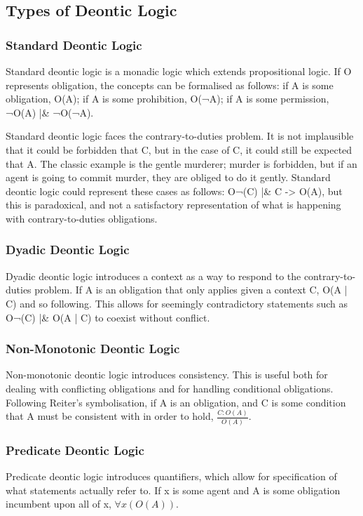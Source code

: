 \documentclass{l4proj}
\begin{document}
\subsection{Types of Deontic Logic}

\subsubsection{Standard Deontic Logic}
Standard deontic logic is a monadic logic which extends propositional logic. If O represents obligation, the concepts can be formalised as follows: if A is some obligation, O(A); if A is some prohibition, O(¬A); if A is some permission, ¬O(A) |\& ¬O(¬A). 

Standard deontic logic faces the contrary-to-duties problem. It is not implausible that it could be forbidden that C, but in the case of C, it could still be expected that A. The classic example is the gentle murderer; murder is forbidden, but if an agent is going to commit murder, they are obliged to do it gently. Standard deontic logic could represent these cases as follows: O¬(C) |\& C -> O(A), but this is paradoxical, and not a satisfactory representation of what is happening with contrary-to-duties obligations. 

\subsubsection{Dyadic Deontic Logic}
Dyadic deontic logic introduces a context as a way to respond to the contrary-to-duties problem. If A is an obligation that only applies given a context C, O(A | C) and so following. This allows for seemingly contradictory statements such as O¬(C) |\& O(A | C) to coexist without conflict. 

\subsubsection{Non-Monotonic Deontic Logic}
Non-monotonic deontic logic introduces consistency\cite{Powers}. This is useful both for dealing with conflicting obligations and for handling conditional obligations\cite{Horty}. Following Reiter's symbolisation\cite{Reiter}, if A is an obligation, and C is some condition that A must be consistent with in order to hold, \( \frac{C : O(A)}{O(A)} \). 

\subsubsection{Predicate Deontic Logic}
Predicate deontic logic\cite{predicate} introduces quantifiers, which allow for specification of what statements actually refer to. If x is some agent and A is some obligation incumbent upon all of x, \( \forall{x(O(A))} \). 
\end{document}
